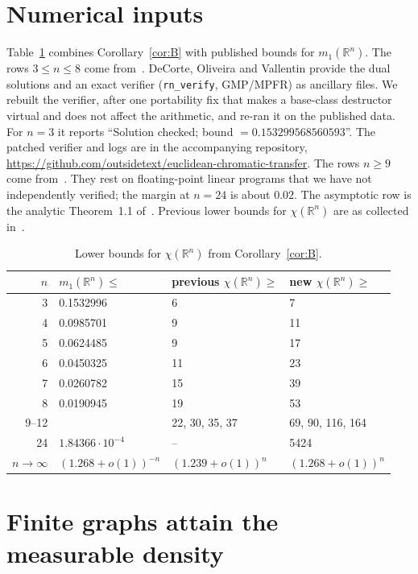 \documentclass[11pt]{amsart}
\theoremstyle{definition}
\newcommand{\R}{\mathbb{R}}
\begin{document}
\section{Numerical inputs}\label{sec:numerics}

Table~\ref{tab:bounds} combines Corollary~\ref{cor:B} with published bounds for $m_1(\R^n)$. The rows $3\le n\le 8$ come from~\cite[Table 2]{DOV}. DeCorte, Oliveira and Vallentin provide the dual solutions and an exact verifier (\texttt{rn\_verify}, GMP/MPFR) as ancillary files. We rebuilt the verifier, after one portability fix that makes a base-class destructor virtual and does not affect the arithmetic, and re-ran it on the published data. For $n=3$ it reports ``Solution checked; bound $=0.153299568560593$''. The patched verifier and logs are in the accompanying repository, \url{https://github.com/outsidetext/euclidean-chromatic-transfer}. The rows $n\ge9$ come from~\cite[Table 3]{BPT}. They rest on floating-point linear programs that we have not independently verified; the margin at $n=24$ is about $0.02$. The asymptotic row is the analytic Theorem~1.1 of~\cite{BPT}. Previous lower bounds for $\chi(\R^n)$ are as collected in~\cite{CKR}.

\begin{table}[h]
\centering
\begin{tabular}{rlll}
\toprule
$n$ & $m_1(\R^n)\le$ & previous $\chi(\R^n)\ge$ & new $\chi(\R^n)\ge$\\
\midrule
3 & 0.1532996 & 6 & 7\\
4 & 0.0985701 & 9 & 11\\
5 & 0.0624485 & 9 & 17\\
6 & 0.0450325 & 11 & 23\\
7 & 0.0260782 & 15 & 39\\
8 & 0.0190945 & 19 & 53\\
9--12 & \cite{BPT} & 22, 30, 35, 37 & 69, 90, 116, 164\\
24 & $1.84366\cdot10^{-4}$ & -- & 5424\\
$n\to\infty$ & $(1.268+o(1))^{-n}$ & $(1.239+o(1))^n$ & $(1.268+o(1))^n$\\
\bottomrule
\end{tabular}
\caption{Lower bounds for $\chi(\R^n)$ from Corollary~\ref{cor:B}.}
\label{tab:bounds}
\end{table}

\section{Finite graphs attain the measurable density}\label{sec:finite}
\end{document}
